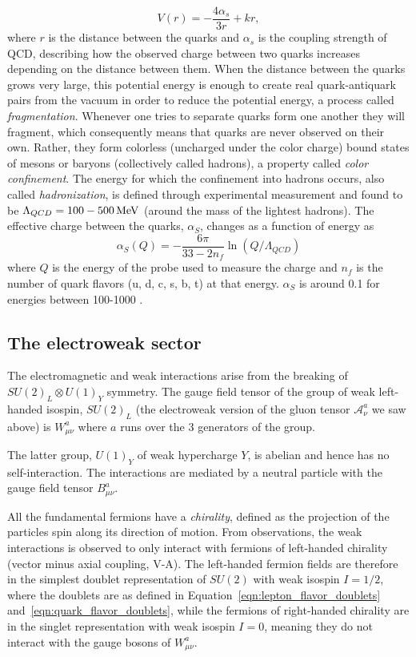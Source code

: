 \begin{equation}
  V(r)=-\frac{4\alpha_s}{3r}+kr,
\end{equation} 
where $r$ is the distance between the quarks and $\alpha_s$ is the coupling strength of QCD, describing how the observed charge between two quarks increases depending on the distance between them. When the distance between the quarks grows very large, this potential energy is enough to create real quark-antiquark pairs from the vacuum in order to reduce the potential energy, a process called \emph{fragmentation}. Whenever one tries to separate quarks form one another they will fragment, which consequently means that quarks are never observed on their own. Rather, they form colorless (uncharged under the color charge) bound states of mesons or baryons (collectively called hadrons), a property called \emph{color confinement}. The energy for which the confinement into hadrons occurs, also called \emph{hadronization}, is defined through experimental measurement and found to be $\Lambda_{QCD}=100-500 \,\text{Me\hspace{-.08em}V}$ (around the mass of the lightest hadrons). The effective charge between the quarks, $\alpha_S$, changes as a function of energy as
 \begin{equation}
   \alpha_S(Q)=-\frac{6\pi}{33-2n_f}\ln(Q/\Lambda_{QCD})
 \end{equation}
where $Q$ is the energy of the probe used to measure the charge and $n_f$ is the number of quark flavors (u, d, c, s, b, t) at that energy. $\alpha_S$ is around 0.1 for energies between 100-1000 \GeV.

\subsection{The electroweak sector}
\label{sec:theaory:ew}
The electromagnetic and weak interactions arise from the breaking of $SU (2)_L \otimes U(1)_Y$ symmetry. The gauge field tensor of the group of weak left-handed isospin, $SU (2)_L$ (the electroweak version of the gluon tensor $\mathcal{A}_{\nu}^a$ we saw above) is $W_{\mu\nu}^a$ where $a$ runs over the 3 generators of the group. 

The latter group, $U(1)_Y$ of weak hypercharge $Y$, is abelian and hence has no self-interaction. The interactions are mediated by a neutral particle with the gauge field tensor $B_{\mu\nu}^a$.\newline

All the fundamental fermions have a \emph{chirality}, defined as the projection of the particles spin along its direction of motion. From observations, the weak interactions is observed to only interact with fermions of left-handed chirality (vector minus axial coupling, V-A). The left-handed fermion fields are therefore in the simplest doublet representation of $SU(2)$ with weak isospin $I=1/2$, where the doublets are as defined in Equation~\ref{eqn:lepton_flavor_doublets} and~\ref{eqn:quark_flavor_doublets}, while the fermions of right-handed chirality are in the singlet representation with weak isospin $I=0$, meaning they do not interact with the gauge bosons of $W_{\mu\nu}^a$.

